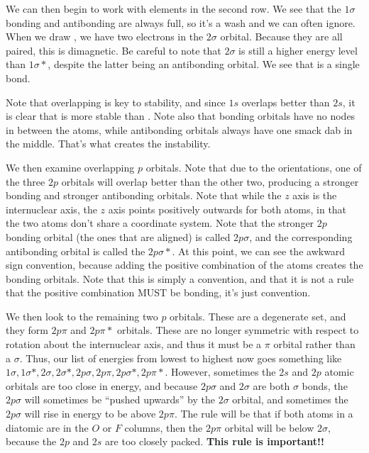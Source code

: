 \documentclass{report}
\begin{document}
We can then begin to work with elements in the second row. We see that the $1\sigma$ bonding and antibonding are always full, so it's a wash and we can often ignore. When we draw , we have two electrons in the $2\sigma$ orbital. Because they are all paired, this is dimagnetic. Be careful to note that $2\sigma$ is still a higher energy level than $1\sigma*$, despite the latter being an antibonding orbital. We see that  is a single bond.

Note that overlapping is key to stability, and since $1s$ overlaps better than $2s$, it is clear that  is more stable than . Note also that bonding orbitals have no nodes in between the atoms, while antibonding orbitals always have one smack dab in the middle. That's what creates the instability.

We then examine overlapping $p$ orbitals. Note that due to the orientations, one of the three $2p$ orbitals will overlap better than the other two, producing a stronger bonding and stronger antibonding orbitals. Note that while the $z$ axis is the internuclear axis, the $z$ axis points positively outwards for both atoms, in that the two atoms don't share a coordinate system. Note that the stronger $2p$ bonding orbital (the ones that are aligned) is called $2p\sigma$, and the corresponding antibonding orbital is called the $2p\sigma*$. At this point, we can see the awkward sign convention, because adding the positive combination of the atoms creates the bonding orbitals. Note that this is simply a convention, and that it is not a rule that the positive combination MUST be bonding, it's just convention. 

We then look to the remaining two $p$ orbitals. These are a degenerate set, and they form $2p\pi$ and $2p\pi*$ orbitals. These are no longer symmetric with respect to rotation about the internuclear axis, and thus it must be a $\pi$ orbital rather than a $\sigma$. Thus, our list of energies from lowest to highest now goes something like $1\sigma, 1\sigma*, 2\sigma, 2\sigma*, 2p\sigma, 2p\pi, 2p\sigma*, 2p\pi*$. However, sometimes the $2s$ and $2p$ atomic orbitals are too close in energy, and because $2p\sigma$ and $2\sigma$ are both $\sigma$ bonds, the $2p\sigma$ will sometimes be ``pushed upwards'' by the $2\sigma$ orbital, and sometimes the $2p\sigma$ will rise in energy to be above $2p\pi$. The rule will be that if both atoms in a diatomic are in the $O$ or $F$ columns, then the $2p\pi$ orbital will be below $2\sigma$, because the $2p$ and $2s$ are too closely packed. \textbf{This rule is important!!}
\end{document}
